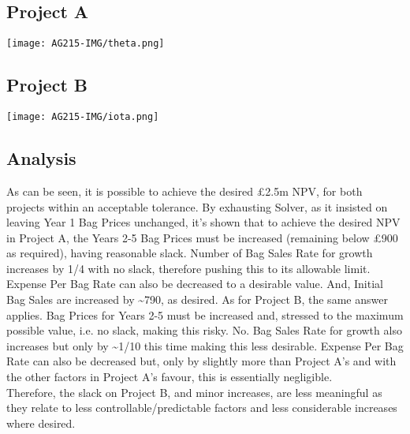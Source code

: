 \documentclass[11pt, english]{article}
\begin{document}
	\subsection{Project A}

	\begin{center}
		\texttt{[image: AG215-IMG/theta.png]}
        \end{center}

	\subsection{Project B}

	\begin{center}
                \texttt{[image: AG215-IMG/iota.png]}
        \end{center}	

	\subsection{Analysis}

	As can be seen, it is possible to achieve the desired \pounds2.5m NPV, for both projects within an acceptable tolerance. By exhausting Solver, as it insisted on leaving Year 1 Bag Prices unchanged, it’s shown that to achieve the desired NPV in Project A, the Years 2-5 Bag Prices must be increased (remaining below \pounds900 as required), having reasonable slack. Number of Bag Sales Rate for growth increases by 1/4 with no slack, therefore pushing this to its allowable limit. Expense Per Bag Rate can also be decreased to a desirable value. And, Initial Bag Sales are increased by \~{}790, as desired. As for Project B, the same answer applies. Bag Prices for Years 2-5 must be increased and, stressed to the maximum possible value, i.e. no slack, making this risky. No. Bag Sales Rate for growth also increases but only by \~{}1/10 this time making this less desirable. Expense Per Bag Rate can also be decreased but, only by slightly more than Project A’s and with the other factors in Project A’s favour, this is essentially negligible.\\

	Therefore, the slack on Project B, and minor increases, are less meaningful as they relate to less controllable/predictable factors and less considerable increases where desired.
\end{document}
